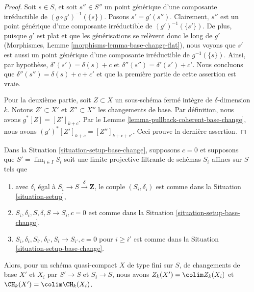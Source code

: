 \begin{proof}
Soit $s \in S$, et soit $s'' \in S''$ un point générique d'une composante
irréductible de $(g \circ g')^{-1}(\{s\})$. Posons $s' = g'(s'')$.
Clairement, $s''$ est un point générique d'une composante irréductible de
$(g')^{-1}(\{s'\})$. De plus, puisque $g'$ est plat et que les générisations
se relèvent donc le long de $g'$ (Morphismes, Lemme \ref{morphisms-lemma-base-change-flat}),
nous voyons que $s'$ est aussi un point générique d'une composante irréductible
de $g^{-1}(\{s\})$. Ainsi, par hypothèse, $\delta'(s') = \delta(s) + c$
et $\delta''(s'') = \delta'(s') + c'$. Nous concluons que
$\delta''(s'') = \delta(s) + c + c'$ et que la première partie de cette
assertion est vraie.

\medskip\noindent
Pour la deuxième partie, soit $Z \subset X$ un sous-schéma fermé intègre
de $\delta$-dimension $k$. Notons $Z' \subset X'$ et $Z'' \subset X''$
les changements de base. Par définition, nous avons $g^*[Z] = [Z']_{k + c}$.
Par le Lemme \ref{lemma-pullback-coherent-base-change}, nous avons
$(g')^*[Z']_{k + c} = [Z'']_{k + c + c'}$. Ceci prouve la dernière assertion.
\end{proof}

\begin{lemma}
\label{lemma-chow-limit}
Dans la Situation \ref{situation-setup-base-change}, supposons $c = 0$
et supposons que $S' = \lim_{i \in I} S_i$ soit une limite projective filtrante
de schémas $S_i$ affines sur $S$ tels que
\begin{enumerate}
\item avec $\delta_i$ égal à $S_i \to S \xrightarrow{\delta} \mathbf{Z}$,
le couple $(S_i, \delta_i)$ est comme dans la Situation \ref{situation-setup},
\item $S_i, \delta_i, S, \delta, S \to S_i, c = 0$ est comme dans la
Situation \ref{situation-setup-base-change},
\item $S_i, \delta_i, S_{i'}, \delta_{i'}, S_i \to S_{i'}, c = 0$ 
pour $i \geq i'$ est comme dans la Situation \ref{situation-setup-base-change}.
\end{enumerate}
Alors, pour un schéma quasi-compact $X$ de type fini sur $S$,
de changements de base $X'$ et $X_i$ par $S' \to S$ et $S_i \to S$, nous avons
$Z_k(X') = \colim Z_k(X_i)$ et $\CH_k(X') = \colim \CH_k(X_i)$.
\end{lemma}

